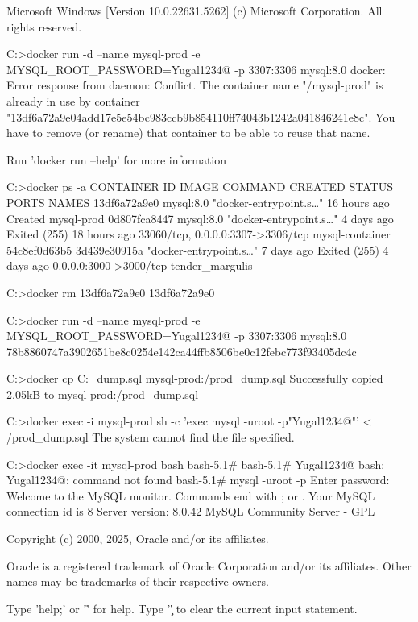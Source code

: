 Microsoft Windows [Version 10.0.22631.5262]
(c) Microsoft Corporation. All rights reserved.

C:\Users\yugalsai>docker run -d --name mysql-prod -e MYSQL_ROOT_PASSWORD=Yugal1234@ -p 3307:3306 mysql:8.0
docker: Error response from daemon: Conflict. The container name "/mysql-prod" is already in use by container "13df6a72a9e04add17e5e54bc983ccb9b854110ff74043b1242a041846241e8c". You have to remove (or rename) that container to be able to reuse that name.

Run 'docker run --help' for more information

C:\Users\yugalsai>docker ps -a
CONTAINER ID   IMAGE          COMMAND                  CREATED        STATUS                      PORTS                               NAMES
13df6a72a9e0   mysql:8.0      "docker-entrypoint.s…"   16 hours ago   Created                                                         mysql-prod
0d807fca8447   mysql:8.0      "docker-entrypoint.s…"   4 days ago     Exited (255) 18 hours ago   33060/tcp, 0.0.0.0:3307->3306/tcp   mysql-container
54c8ef0d63b5   3d439e30915a   "docker-entrypoint.s…"   7 days ago     Exited (255) 4 days ago     0.0.0.0:3000->3000/tcp              tender_margulis

C:\Users\yugalsai>docker rm 13df6a72a9e0
13df6a72a9e0

C:\Users\yugalsai>docker run -d --name mysql-prod -e MYSQL_ROOT_PASSWORD=Yugal1234@ -p 3307:3306 mysql:8.0
78b8860747a3902651be8c0254e142ca44ffb8506be0c12febc773f93405dc4c

C:\Users\yugalsai>docker cp C:\Users\yugalsai\prod_dump.sql mysql-prod:/prod_dump.sql
Successfully copied 2.05kB to mysql-prod:/prod_dump.sql

C:\Users\yugalsai>docker exec -i mysql-prod sh -c 'exec mysql -uroot -p"Yugal1234@"' < /prod_dump.sql
The system cannot find the file specified.

C:\Users\yugalsai>docker exec -it mysql-prod bash
bash-5.1#
bash-5.1# Yugal1234@
bash: Yugal1234@: command not found
bash-5.1# mysql -uroot -p
Enter password:
Welcome to the MySQL monitor.  Commands end with ; or \g.
Your MySQL connection id is 8
Server version: 8.0.42 MySQL Community Server - GPL

Copyright (c) 2000, 2025, Oracle and/or its affiliates.

Oracle is a registered trademark of Oracle Corporation and/or its
affiliates. Other names may be trademarks of their respective
owners.

Type 'help;' or '\h' for help. Type '\c' to clear the current input statement.

